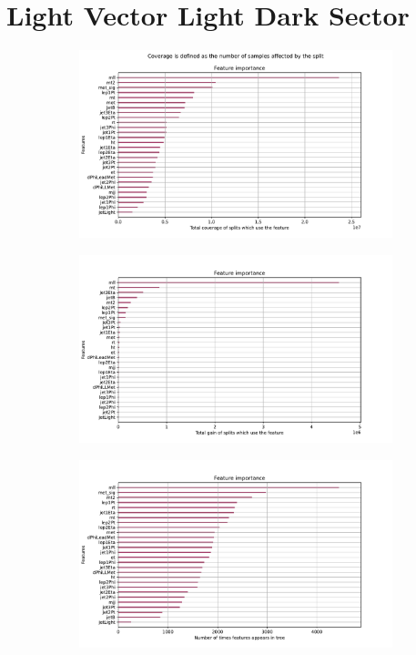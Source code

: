 \documentclass[12pt, a4paper]{book}
\begin{document}
\section{Light Vector Light Dark Sector}
\begin{figure}[!ht]
	\centering
	\begin{subfigure}[b]{0.7\textwidth}
      \centering
      \includegraphics[width=1\textwidth]{XGBoost/LV_LDS/feature_importance/total_cover.pdf}
      \end{subfigure}
      \hfill
      \begin{subfigure}[b]{0.7\textwidth}
         \centering
         \includegraphics[width=1\textwidth]{XGBoost/LV_LDS/feature_importance/total_gain.pdf}
      \end{subfigure}
      \hfill
      \begin{subfigure}[b]{0.7\textwidth}
         \centering
         \includegraphics[width=1\textwidth]{XGBoost/LV_LDS/feature_importance/weight.pdf}

\end{subfigure}
\end{figure}
\end{document}
